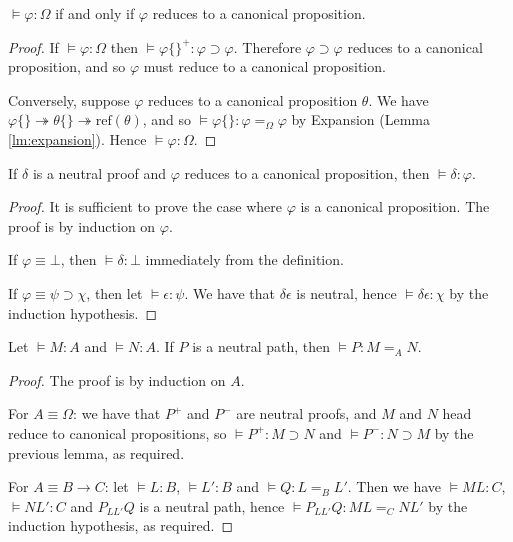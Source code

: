 \documentclass[a4paper,UKenglish]{lipics-v2016}
\newcommand*{\reff}[1]{\ensuremath{\mathrm{ref} \left( {#1} \right)}}
\theoremstyle{plain}
\theoremstyle{definition}
\begin{document}
\begin{lemma}
$\models \varphi : \Omega$ if and only if $\varphi$ reduces to a canonical proposition.
\end{lemma}

\begin{proof}
If $\models \varphi : \Omega$ then $\models \varphi \{\}^+ : \varphi \supset \varphi$.  Therefore $\varphi \supset \varphi$ reduces to a canonical proposition,
and so $\varphi$ must reduce to a canonical proposition.

Conversely, suppose $\varphi$ reduces to a canonical proposition $\theta$.  We have $\varphi \{\} \twoheadrightarrow \theta \{\} \twoheadrightarrow \reff{\theta}$, and so $\models \varphi \{\} : \varphi =_\Omega \varphi$ by Expansion (Lemma \ref{lm:expansion}).  Hence $\models \varphi : \Omega$.
\end{proof}

\begin{lemma}
\label{lm:neutral-proof}
If $\delta$ is a neutral proof and $\varphi$ reduces to a canonical proposition, then $\models \delta : \varphi$.
\end{lemma}

\begin{proof}
It is sufficient to prove the case where $\varphi$ is a canonical proposition.  The proof is by induction on $\varphi$.

If $\varphi \equiv \bot$, then $\models \delta : \bot$ immediately from the definition.

If $\varphi \equiv \psi \supset \chi$, then let $\models \epsilon : \psi$.  We have that $\delta \epsilon$ is neutral,
hence $\models \delta \epsilon : \chi$ by the induction hypothesis.
\end{proof}

\begin{lemma}
\label{lm:neutral-path}
Let $\models M : A$ and $\models N : A$.  If $P$ is a neutral path, then $\models P : M =_A N$.
\end{lemma}

\begin{proof}
The proof is by induction on $A$.

For $A \equiv \Omega$: we have that $P^+$ and $P^-$ are neutral proofs, and $M$ and $N$ head reduce to canonical propositions, so $\models P^+ : M \supset N$ and
$\models P^- : N \supset M$ by the previous lemma, as required.

For $A \equiv B \rightarrow C$: let $\models L : B$, $\models L' : B$ and $\models Q : L =_B L'$.  Then we have $\models ML : C$, $\models NL' : C$ and
$P_{LL'} Q$ is a neutral path, hence $\models P_{L L'} Q : ML =_C NL'$ by the induction hypothesis, as required.
\end{proof}
\end{document}
